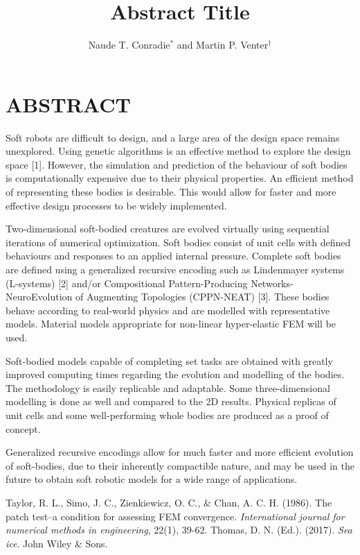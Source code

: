 \documentclass[a4paper]{sacam2020}
\title{Abstract Title}
\author{Naude T. Conradie$^{*}$ and Martin P. Venter$^{\dag}$}
\begin{document}
\thispagestyle{empty}

\section*{ABSTRACT}

Soft robots are difficult to design, and a large area of the design space remains unexplored. Using genetic algorithms is an effective method to explore the design space [1]⁠. However, the simulation and prediction of the behaviour of soft bodies is computationally expensive due to their physical properties. An efficient method of representing these bodies is desirable. This would allow for faster and more effective design processes to be widely implemented.

Two-dimensional soft-bodied creatures are evolved virtually using sequential iterations of numerical optimization. Soft bodies consist of unit cells with defined behaviours and responses to an applied internal pressure. Complete soft bodies are defined using a generalized recursive encoding such as Lindenmayer systems (L-systems) [2] and/or Compositional Pattern-Producing Networks-NeuroEvolution of Augmenting Topologies (CPPN-NEAT) [3]. These bodies behave according to real-world physics and are modelled with representative models. Material models appropriate for non-linear hyper-elastic FEM will be used.

Soft-bodied models capable of completing set tasks are obtained with greatly improved computing times regarding the evolution and modelling of the bodies. The methodology is easily replicable and adaptable. Some three-dimensional modelling is done as well and compared to the 2D results. Physical replicas of unit cells and some well-performing whole bodies are produced as a proof of concept.

Generalized recursive encodings allow for much faster and more efficient evolution of soft-bodies, due to their inherently compactible nature, and may be used in the future to obtain soft robotic models for a wide range of applications.

\begin{thebibliography}{99}
 Taylor, R. L., Simo, J. C., Zienkiewicz, O. C., \& Chan, A. C. H. (1986). The patch test--a condition for assessing FEM convergence. \textit{International journal for numerical methods in engineering}, 22(1), 39-62.
 Thomas, D. N. (Ed.). (2017). \textit{Sea ice}. John Wiley \& Sons.
\end{thebibliography}
\end{document}

